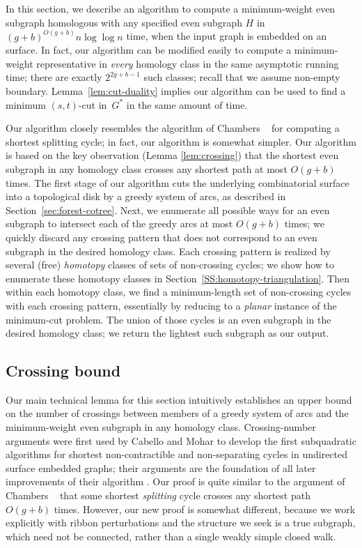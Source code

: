 \documentclass[letterpaper,review]{siamart190516}
\begin{document}
In this section, we describe an
algorithm to compute a minimum-weight even subgraph homologous with any specified even subgraph 
$H$ in $(g+b)^{O(g+b)}n\log \log n$ time, when the input graph is embedded on an  surface.  In fact, our algorithm can be
modified easily to compute a minimum-weight representative in
\emph{every} homology class in the same asymptotic running time;
there are exactly $2^{2g+b-1}$ such classes; recall that we assume non-empty boundary.
Lemma~\ref{lem:cut-duality} implies our algorithm can be used to find a minimum $(s,t)$-cut in~$G^*$ in the same amount of time.

Our algorithm closely resembles the algorithm of Chambers \etal~\cite{ccelw-scsih-08} for computing a shortest splitting cycle; in fact, our algorithm is somewhat simpler.  Our algorithm is based on the key observation (Lemma \ref{lem:crossing})  that the shortest even subgraph in any homology class crosses any shortest path at most $O(g+b)$ times.  The first stage of our algorithm cuts the underlying combinatorial surface into a topological disk by a greedy system of arcs, as described in Section~\ref{sec:forest-cotree}.  Next, we enumerate all possible ways for an even subgraph to intersect each of the greedy arcs at most $O(g+b)$ times; we quickly discard any crossing pattern that does not correspond to an even subgraph in the desired homology class.  Each crossing pattern is realized by several (free) \emph{homotopy} classes of sets of non-crossing cycles; we show how to enumerate these homotopy classes in Section~\ref{SS:homotopy-triangulation}.  Then within each homotopy class, we find a minimum-length set of non-crossing cycles with each crossing pattern, essentially by reducing to a \emph{planar} instance of the minimum-cut problem.  The union of those cycles is an even subgraph in the desired homology class; we return the lightest such subgraph as our output.


\subsection{Crossing bound}
\label{SS:homotopy-crossing}

Our main technical lemma for this section intuitively establishes an upper bound on the number of crossings between members of a greedy system of arcs and the minimum-weight even subgraph in any homology class.  Crossing-number arguments were first used by Cabello and Mohar \cite{cm-fsnsn-07} to develop the first subquadratic algorithms for shortest non-contractible and non-separating cycles in undirected surface embedded graphs; their arguments are the foundation of all later improvements of their algorithm \cite{c-mdpg-06, k-csnco-06, cce-msspe-13}.  Our proof is quite similar to the argument of Chambers \etal~\cite{ccelw-scsih-08} that some shortest \emph{splitting} cycle crosses any shortest path $O(g+b)$ times.  However, our new proof is somewhat different, because we work explicitly with ribbon perturbations and the structure we seek is a true subgraph, which need not be connected, rather than a single weakly simple closed walk.
\end{document}

